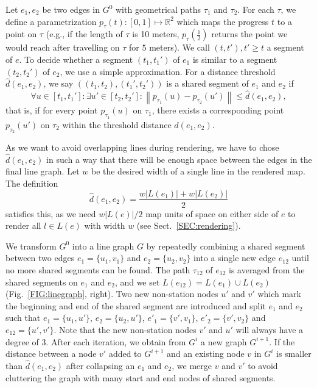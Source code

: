 \documentclass[format=acmsmall, review=false, screen=true]{acmart}
\begin{document}
Let $e_1, e_2$ be two edges in $G^0$ with geometrical paths $\tau_1$ and $\tau_2$. For each $\tau$, we define a parametrization $p_\tau(t): [0,1] \mapsto \mathbb{R}^2$ which maps the progress $t$ to a point on $\tau$ (e.g., if the length of $\tau$ is 10 meters, $p_\tau(\frac{1}{2})$ returns the point we would reach after travelling on $\tau$ for $5$ meters). We call $(t, t'), t' \geq t$ a segment of $e$. To decide whether a segment $(t_1, {t_1}')$ of $e_1$ is similar to a segment $(t_2, {t_2}')$ of $e_2$, we use a simple approximation. For a distance threshold $\hat{d}(e_1, e_2)$, we say $\left(\left(t_1, t_2\right), \left({t_1}', {t_2}'\right)\right)$ is a shared segment of $e_1$ and $e_2$ if
\begin{equation}
	\forall u \in [t_1, {t_1}']: \exists u' \in [t_2, {t_2}']:\left\|p_{\tau_1}(u) - p_{\tau_2}(u')\right\| \leq \hat{d}(e_1, e_2),
\end{equation}
that is, if for every point $p_{\tau_1}(u)$ on $\tau_1$, there exists a corresponding point $p_{\tau_2}(u')$ on $\tau_2$ within the threshold distance $\hat{d}(e_1, e_2)$.

As we want to avoid overlapping lines during rendering, we have to chose $\hat{d}(e_1, e_2)$ in such a way that there will be enough space between the edges in the final line graph. Let $w$ be the desired width of a single line in the rendered map. The definition
\begin{equation}
\hat{d}(e_1, e_2) = \frac{w|L(e_1)| + w|L(e_2)|}{2}
\end{equation}
satisfies this, as we need $w|L(e)| / 2$ map units of space on either side of $e$ to render all $l \in L(e)$ with width $w$ (see Sect.~\ref{SEC:rendering}).

We transform $G^0$ into a line graph $G$ by repeatedly combining a shared segment between two edges $e_1 = \{u_1, v_1\}$ and $e_2 = \{u_2, v_2\}$ into a single new edge $e_{12}$ until no more shared segments can be found. The path $\tau_{12}$ of $e_{12}$ is averaged from the shared segments on $e_1$ and $e_2$, and we set $L(e_{12}) = L(e_1) \cup L(e_2)$ (Fig.~\ref{FIG:linegraph}, right). Two new non-station nodes $u'$ and $v'$ which mark the beginning and end of the shared segment are introduced and split $e_1$ and $e_2$ such that $e_1 = \{u_1, u'\}$, $e_2 = \{u_2, u'\}$, $e'_1 = \{v', v_1\}$, $e'_2 = \{v', v_2\}$ and $e_{12} = \{u', v'\}$. Note that the new non-station nodes $v'$ and $u'$ will always have a degree of 3. After each iteration, we obtain from $G^i$ a new graph $G^{i+1}$. If the distance between a node $v'$ added to $G^{i+1}$ and an existing node $v$ in $G^i$ is smaller than $\hat{d}(e_1, e_2)$ after collapsing an $e_1$ and $e_2$, we merge $v$ and $v'$ to avoid cluttering the graph with many start and end nodes of shared segments. 
\end{document}
